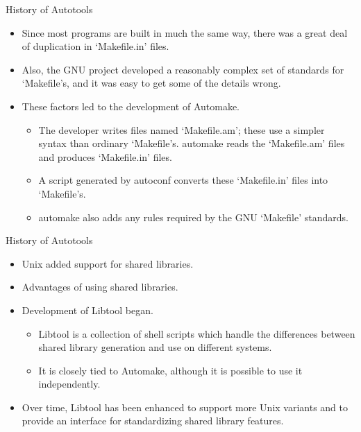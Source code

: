 \documentclass{beamer}
\begin{document}
\begin{frame}{History of Autotools}
\begin{itemize}
	\item Since most programs are built in much the same way, there was a great deal of duplication in `Makefile.in' files.\pause
	\item Also, the GNU project developed a reasonably complex set of standards for `Makefile's, and it was easy to get some of the details wrong.\pause
	\item These factors led to the development of Automake.\pause
	\begin{itemize}
		\item The developer writes files named `Makefile.am'; these use a simpler syntax than ordinary `Makefile's. automake reads the `Makefile.am' files and produces `Makefile.in' files. \pause
		\item A script generated by autoconf converts these `Makefile.in' files into `Makefile's. \pause
		\item  automake also adds any rules required by the GNU `Makefile' standards. \pause
	\end{itemize}
\end{itemize}
\end{frame}


\begin{frame}{History of Autotools}
\begin{itemize}
	\item Unix added support for shared libraries.\pause
	\item Advantages of using shared libraries. \pause
	\item Development of Libtool began. \pause
	\begin{itemize}
		\item Libtool is a collection of shell scripts which handle the differences between shared library generation and use on different systems. 
		\item It is closely tied to Automake, although it is possible to use it independently. 
	\end{itemize}
	\item Over time, Libtool has been enhanced to support more Unix variants and to provide an interface for standardizing shared library features. 
\end{itemize}
\end{frame}
\end{document}
